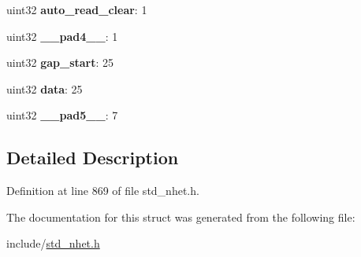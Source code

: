 \begin{DoxyCompactItemize}
\item 
\mbox{\label{structscnt__format_a3b5d4a01738c4da09cb07b36a713a4a8}} 
uint32 {\bfseries auto\+\_\+read\+\_\+clear}\+: 1
\item 
\mbox{\label{structscnt__format_a385b0b8bbd9b2ed37a02230b8252772c}} 
uint32 {\bfseries \+\_\+\+\_\+pad4\+\_\+\+\_\+}\+: 1
\item 
\mbox{\label{structscnt__format_a6310e203fc0d1db8c6fc27b8662bc7b5}} 
uint32 {\bfseries gap\+\_\+start}\+: 25
\item 
\mbox{\label{structscnt__format_aafe2f9c6c7a714c54c6b4a8b655660ec}} 
uint32 {\bfseries data}\+: 25
\item 
\mbox{\label{structscnt__format_a8e0ef0e06ab2277618ba792424fca5fb}} 
uint32 {\bfseries \+\_\+\+\_\+pad5\+\_\+\+\_\+}\+: 7
\end{DoxyCompactItemize}


\subsection{Detailed Description}


Definition at line 869 of file std\+\_\+nhet.\+h.



The documentation for this struct was generated from the following file\+:\begin{DoxyCompactItemize}
\item 
include/\mbox{\hyperlink{std__nhet_8h}{std\+\_\+nhet.\+h}}\end{DoxyCompactItemize}
